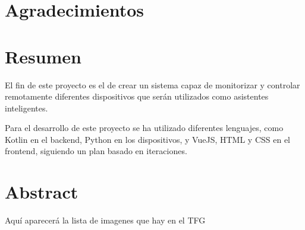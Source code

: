 \documentclass[openright,twoside,10pt]{book}
\begin{document}
\chapter*{Agradecimientos} %


\chapter*{Resumen} %
\begin{flushleft}

El fin de este proyecto es el de crear un sistema capaz de monitorizar y controlar remotamente diferentes dispositivos que serán utilizados como asistentes inteligentes.

Para el desarrollo de este proyecto se ha utilizado diferentes lenguajes, como Kotlin en el backend, Python en los dispositivos, y VueJS, HTML y CSS en el frontend, siguiendo un plan basado en iteraciones.


\end{flushleft}

\chapter*{Abstract} %
\begin{flushleft}


\end{flushleft}

\tableofcontents %

\cleardoublepage
{} %
\listoffigures %

Aquí aparecerá la lista de imagenes que hay en el TFG

\cleardoublepage
{} %
\listoftables %
\end{document}
